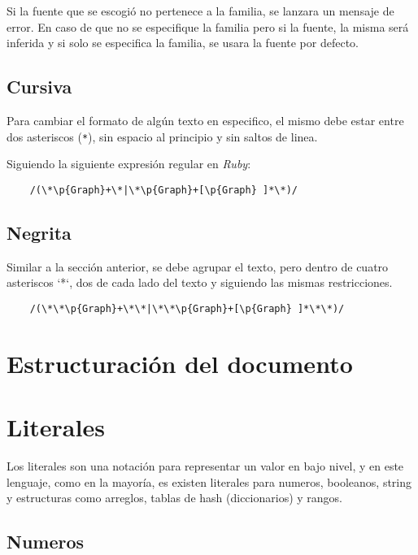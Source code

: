 \documentclass[12pt,letterpaper,titlepage,oneside,openright]{book}
\newcommand{\ruby}{\textit{Ruby}\xspace}
\newcommand{\ttcode}[1]{(\texttt{#1})}
\begin{document}
Si la fuente que se escogió no pertenece a la familia, se lanzara un mensaje de error. En caso de que no se especifique la familia pero si la fuente, la misma será inferida y si solo se especifica la familia, se usara la fuente por defecto.

\subsection{Cursiva}

Para cambiar el formato de algún texto en especifico, el mismo debe estar entre
dos asteriscos \ttcode{*}, sin espacio al principio y sin saltos de linea.

Siguiendo la siguiente expresión regular en \ruby:

\begin{center}
\begin{verbatim}
    /(\*\p{Graph}+\*|\*\p{Graph}+[\p{Graph} ]*\*)/
\end{verbatim}
\end{center}

\subsection{Negrita}

Similar a la sección anterior, se debe agrupar el texto, pero dentro de cuatro
asteriscos `*`, dos de cada lado del texto y siguiendo las mismas restricciones.

\begin{center}
\begin{verbatim}
    /(\*\*\p{Graph}+\*\*|\*\*\p{Graph}+[\p{Graph} ]*\*\*)/
\end{verbatim}
\end{center}

\section{Estructuración del documento}

\section{Literales}

Los literales son una notación para representar un valor en bajo nivel, y en este lenguaje, como en la mayoría, es existen literales para numeros, booleanos, string y estructuras como arreglos, tablas de hash (diccionarios) y rangos.

\subsection{Numeros}
\end{document}
